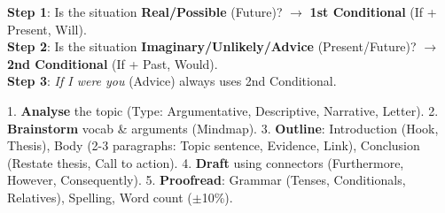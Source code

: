 \documentclass[11pt]{article}
\begin{document}
\begin{bilan}
\begin{methode}
\textbf{Step 1}: Is the situation \textbf{Real/Possible} (Future)? $\rightarrow$ \textbf{1st Conditional} (If + Present, Will).\\
\textbf{Step 2}: Is the situation \textbf{Imaginary/Unlikely/Advice} (Present/Future)? $\rightarrow$ \textbf{2nd Conditional} (If + Past, Would).\\
\textbf{Step 3}: \textit{If I were you} (Advice) always uses 2nd Conditional.
\end{methode}

\begin{methode}
1. \textbf{Analyse} the topic (Type: Argumentative, Descriptive, Narrative, Letter). 2. \textbf{Brainstorm} vocab \& arguments (Mindmap). 3. \textbf{Outline}: Introduction (Hook, Thesis), Body (2-3 paragraphs: Topic sentence, Evidence, Link), Conclusion (Restate thesis, Call to action). 4. \textbf{Draft} using connectors (Furthermore, However, Consequently). 5. \textbf{Proofread}: Grammar (Tenses, Conditionals, Relatives), Spelling, Word count ($\pm$10\%).
\end{methode}

\end{bilan}
\end{document}
